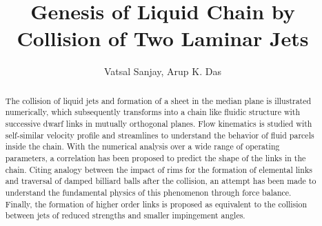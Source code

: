 \documentclass{jfm}
\title{Genesis of Liquid Chain by Collision of Two Laminar Jets}
\author{Vatsal Sanjay,
  Arup K. Das\corresp{\email{arupdas80@gmail.com}}}
\affiliation{Department of Mechanical and Industrial Engineering, Indian Institute of Technology, Roorkee 247667, India}
\begin{document}
\newcommand{\MarkerCircleRed}{\raisebox{0.5pt}{\tikz{\node[draw,scale=0.4,circle,fill=red!100!red](){};}}}
\newcommand{\MarkerSquareRed}{\raisebox{0.5pt}{\tikz{\node[draw,scale=0.4,regular polygon, regular polygon sides=4,fill=black!20!red](){};}}}
\newcommand{\MarkerDiamondBlack}{\raisebox{0pt}{\tikz{\node[draw,scale=0.4,diamond,fill=black!100!](){};}}}
\newcommand{\MarkerSquareEmpty}{\raisebox{0pt}{\tikz{\node[draw,scale=0.4,regular polygon, regular polygon sides=4](){};}}}
\newcommand{\MarkerCircleEmpty}{\raisebox{0pt}{\tikz{\node[draw,scale=0.4,circle](){};}}}
\maketitle
\begin{abstract}
The collision of liquid jets and formation of a sheet in the median plane is illustrated numerically, which subsequently transforms into a chain like fluidic structure with successive dwarf links in mutually orthogonal planes. Flow kinematics is studied with self-similar velocity profile and streamlines to understand the behavior of fluid parcels inside the chain. With the numerical analysis over a wide range of operating parameters, a correlation has been proposed to predict the shape of the links in the chain. Citing analogy between the impact of rims for the formation of elemental links and traversal of damped billiard balls after the collision, an attempt has been made to understand the fundamental physics of this phenomenon through force balance. Finally, the formation of higher order links is proposed as equivalent to the collision between jets of reduced strengths and smaller impingement angles.
\end{abstract}
\begin{keywords}
\end{keywords}
\vspace{-15mm}
\end{document}
